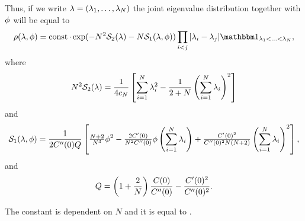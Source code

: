 Thus, if we write $\lambda = (\lambda_1, \ldots, \lambda_N)$ the joint eigenvalue distribution together with $\phi$ will be equal to 
\begin{align*}
    \rho(\lambda,\rf) = \operatorname{const} \cdot \exp(- \dimension^2 \mathcal{S}_2(\lambda) - \dimension \mathcal{S}_1 (\lambda, \rf)) \prod_{i<j} |\lambda_i - \lambda_j| \ind_{\lambda_1 < \ldots < \lambda_\dimension},
\end{align*}
where
\begin{align*}
    N^2 \mathcal{S}_2(\lambda) = \frac{1}{4c_N}  \left[ \sum_{i=1}^N \lambda_i^2 - \frac{1}{2+N} \left(\sum_{i=1}^N \lambda_i \right)^2 \right]
\end{align*}
and
\begin{align*}
    \mathcal{S}_1(\lambda, \phi) = \frac1{2C''(0)Q}\left[
        \tfrac{N+2}{N^3}\phi^2
        - \tfrac{2C'(0)}{N^2C''(0)}\phi\left(\sum_{i=1}^N \lambda_i \right)
        + \tfrac{C'(0)^2}{C''(0)^2N(N+2)}\left(\sum_{i=1}^N \lambda_i \right)^2
    \right],
\end{align*}
and
\[
	Q = \left(1+\frac2{N}\right)
	\frac{C(0)}{C''(0)} - \frac{C'(0)^2}{C''(0)^2}.
\]

The constant is dependent on $N$ and it is equal to .